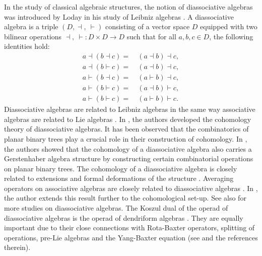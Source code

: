 \documentclass[a4paper,reqno,10pt]{amsart}
\theoremstyle{plain}
\theoremstyle{definition}
\theoremstyle{remark}
\begin{document}
\medskip

 In the study of classical algebraic structures, the notion of diassociative algebras was introduced by Loday in his study of Leibniz algebras \cite{loday1}. A diassociative algebra is a triple $(D,\dashv,~ \! \vdash)$ consisting of a vector space $D$ equipped with two bilinear operations $\dashv,~ \! \vdash: D \times D \to D $ such that for all $a, b, c \in D$, the following identities hold:
\begin{align}
a \dashv (b \dashv c) =~& (a \dashv b ) \dashv c, \label{di-1}\\
a \dashv (b \vdash c) =~& (a \dashv b ) \dashv c, \label{di-2}\\
a \vdash (b \dashv c) =~& (a \vdash b) \dashv c, \label{di-3}\\
a \vdash (b \vdash c) =~& (a \dashv b) \vdash c, \label{di-4}\\
a \vdash (b \vdash c) =~& (a \vdash b) \vdash c \label{di-5}.
\end{align}
Diassociative algebras are related to Leibniz algebras in the same way associative algebras are related to Lie algebras \cite{loday-pirashvili}. In \cite{Frabetti,loday1}, the authors developed the cohomology theory of diassociative algebras. It has been observed that the combinatorics of planar binary trees play a crucial role in their construction of cohomology. In \cite{yau,maj-muk,Das}, the authors showed that the cohomology of a diassociative algebra also carries a Gerstenhaber algebra structure by constructing certain combinatorial operations on planar binary trees. The cohomology of a diassociative algebra is closely related to extensions and formal deformations of the structure \cite{majumdar-mukherjee}. Averaging operators on associative algebras are closely related to diassociative algebras \cite{loday1}. In \cite{das-cont}, the author extends this result further to the cohomological set-up. See also \cite{Frabetti,loday1, majumdar-mukherjee} for more studies on diassociative algebras. The Koszul dual of the operad of diassociative algebras is the operad of dendriform algebras \cite{loday1}. They are equally important due to their close connections with Rota-Baxter operators, splitting of operations, pre-Lie algebras and the Yang-Baxter equation (see \cite{bai-guo-ni} and the references therein). 
   
\end{document}
